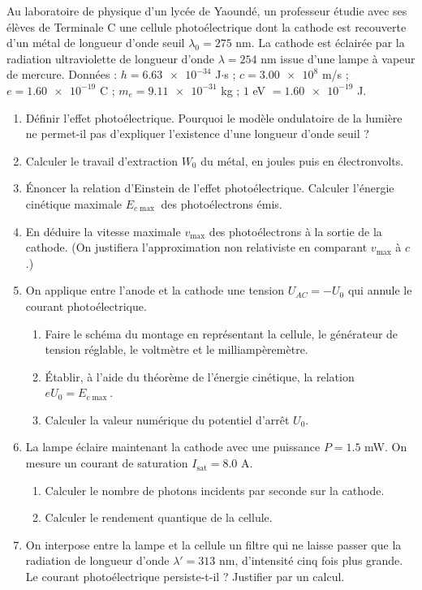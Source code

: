 \documentclass[11pt]{article}
\newcounter{popsec}
\newcounter{popsub}
\newcommand{\courssub}[1]{%
  \stepcounter{popsub}%
  \par\vspace{9pt}\noindent{\popxbold\fontsize{11.5}{13}\selectfont\color{popink}{\color{poporange}\thepopsec.\thepopsub}\hspace{6pt}#1}\par\nopagebreak\vspace{4pt}
}
\begin{document}
\courssub{Je me prépare au Bac}

\begin{exercice}
Au laboratoire de physique d'un lycée de Yaoundé, un professeur étudie avec ses élèves de Terminale C une cellule photoélectrique dont la cathode est recouverte d'un métal de longueur d'onde seuil $\lambda_0 = \num{275}$ nm. La cathode est éclairée par la radiation ultraviolette de longueur d'onde $\lambda = \num{254}$ nm issue d'une lampe à vapeur de mercure.
Données : $h = \num{6,63e-34}$ J$\cdot$s ; $c = \num{3,00e8}$ m/s ; $e = \num{1,60e-19}$ C ; $m_e = \num{9,11e-31}$ kg ; $\num{1}$ eV $= \num{1,60e-19}$ J.
\begin{enumerate}
\item Définir l'effet photoélectrique. Pourquoi le modèle ondulatoire de la lumière ne permet-il pas d'expliquer l'existence d'une longueur d'onde seuil ?
\item Calculer le travail d'extraction $W_0$ du métal, en joules puis en électronvolts.
\item Énoncer la relation d'Einstein de l'effet photoélectrique. Calculer l'énergie cinétique maximale $E_{c\max}$ des photoélectrons émis.
\item En déduire la vitesse maximale $v_{\max}$ des photoélectrons à la sortie de la cathode. (On justifiera l'approximation non relativiste en comparant $v_{\max}$ à $c$.)
\item On applique entre l'anode et la cathode une tension $U_{AC} = -U_0$ qui annule le courant photoélectrique.
\begin{enumerate}
\item Faire le schéma du montage en représentant la cellule, le générateur de tension réglable, le voltmètre et le milliampèremètre.
\item Établir, à l'aide du théorème de l'énergie cinétique, la relation $eU_0 = E_{c\max}$.
\item Calculer la valeur numérique du potentiel d'arrêt $U_0$.
\end{enumerate}
\item La lampe éclaire maintenant la cathode avec une puissance $P = \num{1,5}$ mW. On mesure un courant de saturation $I_{\text{sat}} = \num{8,0}$ \textmu A.
\begin{enumerate}
\item Calculer le nombre de photons incidents par seconde sur la cathode.
\item Calculer le rendement quantique de la cellule.
\end{enumerate}
\item On interpose entre la lampe et la cellule un filtre qui ne laisse passer que la radiation de longueur d'onde $\lambda' = \num{313}$ nm, d'intensité cinq fois plus grande. Le courant photoélectrique persiste-t-il ? Justifier par un calcul.
\end{enumerate}
\end{exercice}
\end{document}
